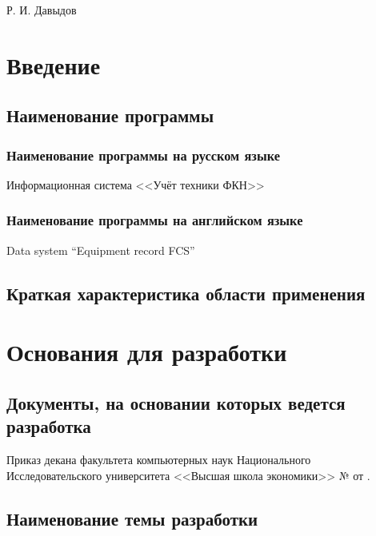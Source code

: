 \documentclass[a4paper,12pt,reqno]{article}
\begin{document}

	
	
	{Р. И. Давыдов}
	
	\firstPage
						\newpage
	\secondPage
						\newpage
	\thirdPage
						\newpage
	\section{Введение}
	\subsection{Наименование программы}
	\subsubsection{Наименование программы на русском языке}
	{Информационная система <<Учёт техники ФКН>>}
	\subsubsection{Наименование программы на английском языке}
	{Data system “Equipment record FCS”}
	\subsection{Краткая характеристика области применения}
	
	\newpage
	\section{Основания для разработки}
	\subsection{Документы, на основании которых ведется разработка}
	
	
	Приказ декана факультета компьютерных наук Национального Исследовательского университета <<Высшая школа экономики>> № {\color{red}{TODO}} от {\color{red}{TODO}}.
	
	\subsection{Наименование темы разработки}
	
\end{document}
